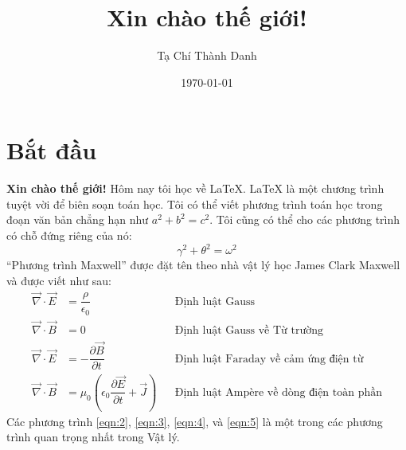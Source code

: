 \documentclass[a4paper,12pt,notitlepage]{article}
\title{Xin chào thế giới!}
\author{Tạ Chí Thành Danh}
\date{\today}
\begin{document}
	\maketitle
	\section{Bắt đầu}
	\textbf{Xin chào thế giới!} Hôm nay tôi học về \LaTeX. \LaTeX{} là một chương trình tuyệt vời để biên soạn toán học. Tôi có thể viết phương trình toán học trong đoạn văn bản chẳng hạn như $a^2 + b^2 = c^2$. Tôi cũng có thể cho các phương trình có chỗ đứng riêng của nó:
	\begin{equation}
		\gamma^2 + \theta^2 = \omega^2
	\end{equation}
	``Phương trình Maxwell'' được đặt tên theo nhà vật lý học James Clark Maxwell và được viết như sau:
	\begin{align} 
		\vec\nabla \cdot \vec E &= \dfrac{\rho}{\epsilon_0} && \text{Định luật Gauss} \label{eqn:2} \\
		\vec\nabla \cdot \vec B &= 0 && \text{Định luật Gauss về Từ trường} \label{eqn:3} \\
		\vec\nabla \cdot \vec E &= -\dfrac{\partial \vec B}{\partial t} && \text{Định luật Faraday về cảm ứng điện từ} \label{eqn:4} \\
		\vec\nabla \cdot \vec B &= \mu_0 \left(\epsilon_0 \dfrac{\partial \vec E}{\partial t} + \vec J\right) && \text{Định luật Ampère về dòng điện toàn phần} \label{eqn:5}
	\end{align}
	Các phương trình \ref{eqn:2}, \ref{eqn:3}, \ref{eqn:4}, và \ref{eqn:5} là một trong các phương trình quan trọng nhất trong Vật lý.
\end{document}
